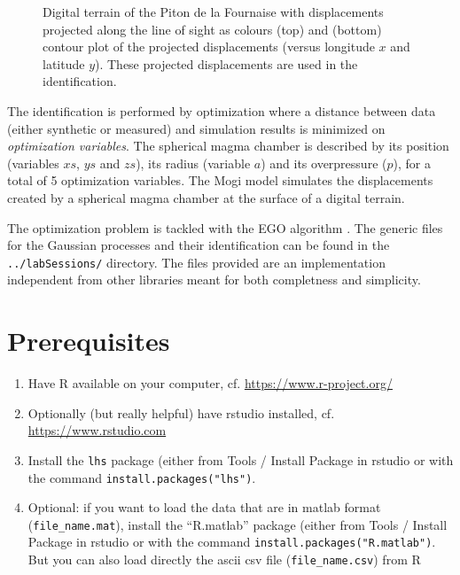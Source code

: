 \documentclass[12pt]{article}
\begin{document}
\begin{figure}
\begin{center}
\begin{minipage}{0.44\textwidth}
\end{minipage}
\end{center}
\caption{Digital terrain of the Piton de la Fournaise with displacements projected along the line of sight as colours (top) 
and (bottom) contour plot of the projected displacements (versus longitude $x$ and latitude $y$). 
These projected displacements are used in the identification.}
\label{fig-piton}
\end{figure}

The identification is performed by optimization where a distance between data (either synthetic or measured) 
and simulation results is minimized on \emph{optimization variables}. 
The spherical magma chamber is described by its position (variables $xs$, $ys$ and $zs$), its radius (variable $a$) and 
its overpressure ($p$), for a total of 5 optimization variables. The Mogi model \cite{Yamakawa1955,Mogi1958} simulates the displacements created 
by a spherical magma chamber at the surface of a digital terrain.

The optimization problem is tackled with the EGO algorithm \cite{Jones1998}. 
The generic files for the Gaussian processes and their identification can be found in the \texttt{../labSessions/} directory.
The files provided are an implementation independent from other libraries meant for both completness and simplicity.

\section{Prerequisites}
\begin{enumerate}
\item Have R available on your computer, cf. \url{https://www.r-project.org/}
\item Optionally (but really helpful) have rstudio installed, cf. \url{https://www.rstudio.com}
\item Install the \texttt{lhs} package (either from Tools / Install Package in rstudio or with the command \texttt{install.packages("lhs")}.
\item Optional: if you want to load the data that are in matlab format (\texttt{file\_name.mat}), 
install the ``R.matlab'' package (either from Tools / Install Package in rstudio or with the command \texttt{install.packages("R.matlab")}. But you can also load directly the ascii csv file (\texttt{file\_name.csv}) from R
\end{enumerate}
\end{document}
